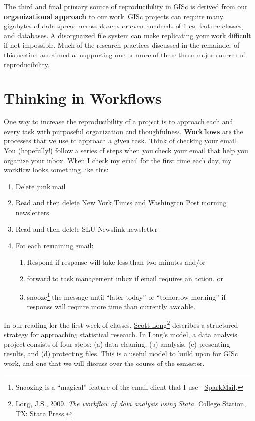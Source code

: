 \documentclass[]{book}
\providecommand{\tightlist}{%
  \setlength{\itemsep}{0pt}\setlength{\parskip}{0pt}}
\let\rmarkdownfootnote\footnote%
\def\footnote{\protect\rmarkdownfootnote}
\begin{document}
The third and final primary source of reproducibility in GISc is derived
from our \textbf{organizational approach} to our work. GISc projects can
require many gigabytes of data spread across dozens or even hundreds of
files, feature classes, and databases. A disorgnaized file system can
make replicating your work difficult if not impossible. Much of the
research practices discussed in the remainder of this section are aimed
at supporting one or more of these three major sources of
reproducibility.

\section{Thinking in Workflows}\label{thinking-in-workflows}

One way to increase the reproducibility of a project is to approach each
and every task with purposeful organization and thoughfulness.
\textbf{Workflows} are the processes that we use to approach a given
task. Think of checking your email. You (hopefully!) follow a series of
steps when you check your email that help you organize your inbox. When
I check my email for the first time each day, my workflow looks
something like this:

\begin{enumerate}
\def\labelenumi{\arabic{enumi}.}
\tightlist
\item
  Delete junk mail
\item
  Read and then delete New York Times and Washington Post morning
  newsletters
\item
  Read and then delete SLU Newslink newsletter
\item
  For each remaining email:

  \begin{enumerate}
  \def\labelenumii{\alph{enumii}.}
  \tightlist
  \item
    Respond if response will take less than two minutes and/or
  \item
    forward to task management inbox if email requires an action, or
  \item
    snooze\footnote{Snoozing is a ``magical'' feature of the email
      client that I use - \href{http://sparkmailapp.com}{SparkMail}.}
    the message until ``later today'' or ``tomorrow morning'' if
    response will require more time than currently avaiable.
  \end{enumerate}
\end{enumerate}

In our reading for the first week of classes,
\href{http://www.indiana.edu/~jslsoc/}{Scott Long}\footnote{Long, J.S.,
  2009. \emph{The workflow of data analysis using Stata.} College
  Station, TX: Stata Press.} describes a structured strategy for
approaching statistical research. In Long's model, a data analysis
project consists of four steps: (a) data cleaning, (b) analysis, (c)
presenting results, and (d) protecting files. This is a useful model to
build upon for GISc work, and one that we will discuss over the course
of the semester.
\end{document}
